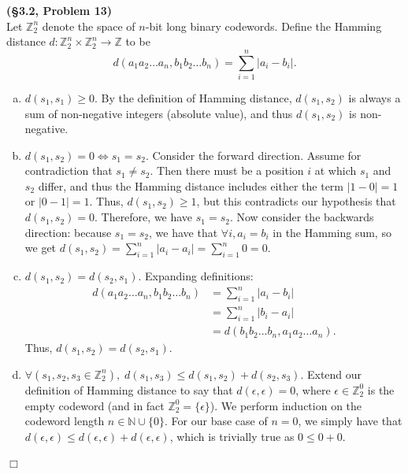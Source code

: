\documentclass[12pt]{article}
\theoremstyle{definition}
\newenvironment{Solution}{\noindent {\sc Solution.}}{$\Box$ \vspace{2 ex}}
\begin{document}
\begin{Solution}
{\bf (\S3.2, Problem 13)}\\
Let $\mathbb{Z}_2^n$ denote the space of $n$-bit long binary codewords. Define the Hamming distance $d : \mathbb{Z}_2^n \times \mathbb Z_2^n \to \mathbb Z$ to be
\[ d(a_1a_2\dots a_n, b_1b_2\dots b_n) = \sum_{i=1}^n |a_i-b_i|. \]
\begin{enumerate}[(a)]
    \item $d(s_1,s_1) \ge 0$. By the definition of Hamming distance, $d(s_1,s_2)$ is always a sum of non-negative integers (absolute value), and thus $d(s_1,s_2)$ is non-negative.
    \item $d(s_1,s_2) = 0 \iff s_1 = s_2$. Consider the forward direction. Assume for contradiction that $s_1 \ne s_2$. Then there must be a position $i$ at which $s_1$ and $s_2$ differ, and thus the Hamming distance includes either the term $|1 - 0| =1$ or $|0 - 1| = 1$. Thus, $d(s_1,s_2)\ge 1$, but this contradicts our hypothesis that $d(s_1,s_2)=0$. Therefore, we have $s_1 = s_2$. Now consider the backwards direction: because $s_1 = s_2$, we have that $\forall i, a_i = b_i$ in the Hamming sum, so we get $d(s_1,s_2)=\sum_{i=1}^n |a_i -a_i| = \sum_{i=1}^n 0 = 0.$
    \item $d(s_1,s_2)=d(s_2,s_1)$. Expanding definitions:
    \begin{align*}
        d(a_1a_2\dots a_n, b_1b_2\dots b_n) &= \sum_{i=1}^n |a_i-b_i| \\
         &= \sum_{i=1}^n |b_i-a_i|
         \\ &=d(b_1b_2\dots b_n, a_1a_2\dots a_n).
    \end{align*}
    Thus, $d(s_1, s_2)=d(s_2,s_1)$.
    \item $\forall(s_1,s_2,s_3\in \mathbb{Z}_2^n),\;d(s_1,s_3)\le d(s_1,s_2)+d(s_2,s_3)$. Extend our definition of Hamming distance to say that $d(\epsilon,\epsilon) = 0$, where $\epsilon \in \mathbb{Z}_2^0$ is the empty codeword (and in fact $\mathbb{Z}_2^0 = \{\epsilon\}$). We perform induction on the codeword length $n \in \mathbb{N}\cup \{0\}$. For our base case of $n=0$, we simply have that $d(\epsilon, \epsilon) \le d(\epsilon,\epsilon)+d(\epsilon, \epsilon)$, which is trivially true as $0 \le 0 + 0$. 
    

\end{enumerate}
\end{Solution}
\end{document}
